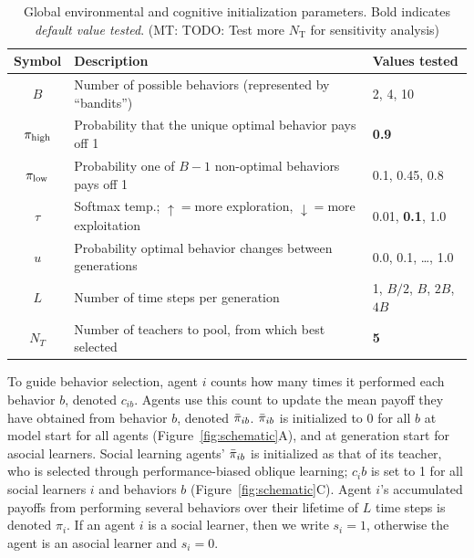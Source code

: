 \documentclass[letterpaper,11.5pt]{scrartcl}
\newcommand{\mt}[1]{{\textcolor{myorange} {({\tiny MT:} #1)}}}
\begin{document}
\vspace{2em}
\begin{table}[h]
    \caption{Global environmental and cognitive initialization parameters.
      Bold indicates \emph{default value tested}.
    \mt{TODO: Test more $N_\text{T}$ for sensitivity analysis}}
    \label{tab:modelParameters}
    \centering %
    \begin{tabular}{cp{4.0in}p{1.25in}} \toprule

        Symbol & Description & Values tested \\ 

        \midrule  

        $B$       & Number of possible behaviors (represented by ``bandits'') 
                  & 2, 4, 10 \\

        $\pi_{\mathrm{high}}$ & Probability that the unique optimal behavior pays off 1 
                & \textbf{0.9} \\

        $\pi_{\mathrm{low}}$ & Probability one of $B - 1$ non-optimal behaviors pays off 1 
                 & 0.1, 0.45, 0.8 \\ 

        $\tau$ & Softmax temp.; $\uparrow=$more exploration, $\downarrow=$more
                    exploitation 
               & 0.01, \textbf{0.1}, 1.0 \\
        
        $u$    & Probability optimal behavior changes between generations 
               & 0.0, 0.1, \ldots, 1.0 \\

        $L$    & Number of time steps per generation & 1, $B/2$, $B$, $2B$, $4B$ \\

        $N_T$    & Number of teachers to pool, from which best selected 
                 & \textbf{5}  \\

            
               
        \bottomrule
        \end{tabular} 
\end{table}


To guide behavior selection, agent $i$ counts how many times it
performed each behavior $b$, denoted $c_{ib}$. Agents use this count to 
update the mean payoff they have obtained from behavior $b$, denoted $\bar\pi_{ib}$.
$\bar\pi_{ib}$ is initialized to 0 for all $b$ at model start for
all agents (Figure~\ref{fig:schematic}A), and at 
generation start for asocial learners. Social
learning agents' $\bar\pi_{ib}$ is initialized as that of its teacher, who is selected
through performance-biased oblique learning; $c_ib$ is set to 1 for all social
learners $i$ and behaviors $b$ (Figure~\ref{fig:schematic}C). Agent $i$'s
accumulated payoffs from performing several behaviors over their lifetime of $L$
time steps is denoted $\pi_{i}$. If an agent $i$ is a social learner, then we write
$s_i = 1$, otherwise the agent is an asocial learner and $s_i = 0$.
\end{document}
